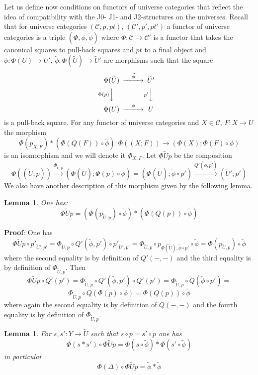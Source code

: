 \documentclass[12pt]{article}
\newenvironment{eq}{\begin{equation}}{\end{equation}}
\newenvironment{myproof}{{\bf Proof}:}{\vskip 5mm }
\newtheorem{lemma}[proposition]{Lemma}
\newcommand{\llabel}[1]{\label{#1}}
\newcommand{\sr}{\rightarrow}
\newcommand{\lr}{\longrightarrow}
\newcommand{\wt}{\widetilde}
\begin{document}
Let us define now conditions on functors of universe categories that reflect the idea of compatibility with the J0- J1- and J2-structures on the universes. Recall that for universe categories $({\mathcal C},p,pt)$, $({\mathcal C}',p',pt')$ a functor of universe categories is a triple $(\Phi,\phi,\wt{\phi})$ where $\Phi:{\mathcal C}\sr {\mathcal C}'$ is a functor that takes the canonical squares to pull-back squares and $pt$ to a final object and $\phi:\Phi(U)\sr U'$, $\wt{\phi}:\Phi(\wt{U})\sr \wt{U}'$ are morphisms such that the square
%
\begin{eq}\llabel{2015.04.06.eq10}
\begin{CD}
\Phi(\wt{U}) @>\wt{\phi}>> \wt{U}'\\
@V\Phi(p) VV @Vp' VV\\
\Phi(U) @>\phi>> U
\end{CD}
\end{eq}
%
is a pull-back square. For any functor of universe categories and $X\in{\mathcal C}$, $F:X\sr U$ the morphism
%
$$\Phi(p_{X,F})*(\Phi(Q(F))\circ\wt{\phi}):\Phi((X;F))\sr (\Phi(X);\Phi(F)\circ\phi)$$
%
is an isomorphism and we will denote it $\Phi_{X,F}$. Let $\Phi\wt{U}p$ be the composition
%
$$\Phi((\wt{U};p)) \stackrel{\Phi_{\wt{U},p}}{\lr} (\Phi(\wt{U});\Phi(p)\circ \phi)=(\Phi(\wt{U});\wt{\phi}\circ p')\stackrel{Q'(\wt{\phi},p')}{\lr} (\wt{U}';p')$$
%
We also have another description of this morphism given by the following lemma.
%
\begin{lemma}
\llabel{2015.04.10.l5}
One has:
%
$$\Phi\wt{U}p=(\Phi(p_{\wt{U},p})\circ\wt{\phi})*(\Phi(Q(p))\circ\wt{\phi})$$
%
\end{lemma}
%
\begin{myproof}
One has
%
$$\Phi\wt{U}p\circ p'_{\wt{U}',p'}=\Phi_{\wt{U},p}\circ Q'(\wt{\phi},p')\circ p'_{\wt{U}',p'} =\Phi_{\wt{U},p}\circ p_{\Phi(\wt{U}),\wt{\phi}\circ p'}\circ\wt{\phi}=\Phi(p_{\wt{U},p})\circ \wt{\phi}$$
%
where the second equality is by definition of $Q'(-,-)$ and the third equality is by definition of $\Phi_{\wt{U},p}$. Then
%
$$\Phi\wt{U}p\circ Q'(p')=\Phi_{\wt{U},p}\circ Q'(\wt{\phi},p')\circ Q'(p')=\Phi_{\wt{U},p}\circ Q(\wt{\phi}\circ p')=$$$$\Phi_{\wt{U},p}\circ Q(\Phi(p)\circ \phi)=\Phi(Q(p))\circ \wt{\phi}$$
%
where again the second equality is by definition of $Q(-,-)$ and the fourth equality is by definition of $\Phi_{\wt{U},p}$. 
\end{myproof}
%
\begin{lemma}
\llabel{2015.04.10.l6}
For $s,s':Y\sr \wt{U}$ such that $s\circ p=s'\circ p$ one has
%
$$\Phi(s*s')\circ\Phi\wt{U}p=\Phi(s\circ \wt{\phi})*\Phi(s'\circ\wt{\phi})$$
%
in particular
%
$$\Phi(\Delta)\circ \Phi\wt{U}p = \wt{\phi}*\wt{\phi}$$
%
\end{lemma}
\end{document}
